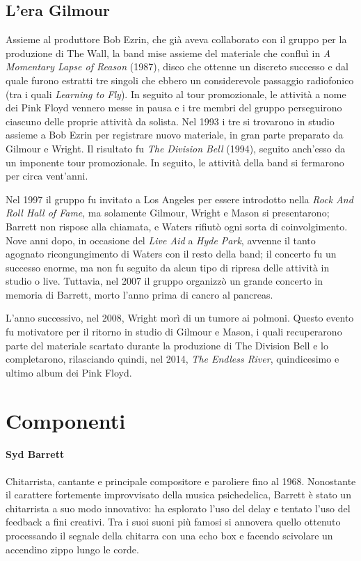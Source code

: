 \documentclass[class=book, crop=false, oneside, 12pt]{standalone}
\begin{document}
    \subsection{L'era Gilmour}
    Assieme al produttore Bob Ezrin, che già aveva collaborato con il gruppo per la produzione di The Wall, la band mise assieme del materiale che confluì in \emph{A Momentary Lapse of Reason} (1987), disco che ottenne un discreto successo e dal quale furono estratti tre singoli che ebbero un considerevole passaggio radiofonico (tra i quali \emph{Learning to Fly}). In seguito al tour promozionale, le attività a nome dei Pink Floyd vennero messe in pausa  e i tre membri del gruppo perseguirono ciascuno delle proprie attività da solista. Nel 1993 i tre si trovarono in studio assieme a Bob Ezrin per registrare nuovo materiale, in gran parte preparato da Gilmour e Wright. Il risultato fu \emph{The Division Bell} (1994), seguito anch'esso da un imponente tour promozionale. In seguito, le attività della band si fermarono per circa vent'anni.

    Nel 1997 il gruppo fu invitato a Los Angeles per essere introdotto nella \emph{Rock And Roll Hall of Fame}, ma solamente Gilmour, Wright e Mason si presentarono; Barrett non rispose alla chiamata, e Waters rifiutò ogni sorta di coinvolgimento. Nove anni dopo, in occasione del \emph{Live Aid} a \emph{Hyde Park}, avvenne il tanto agognato ricongungimento di Waters con il resto della band; il concerto fu un successo enorme, ma non fu seguito da alcun tipo di ripresa delle attività in studio o live. Tuttavia, nel 2007 il gruppo organizzò un grande concerto in memoria di Barrett, morto l'anno prima di cancro al pancreas.

    L'anno successivo, nel 2008, Wright morì di un tumore ai polmoni. Questo evento fu motivatore per il ritorno in studio di Gilmour e Mason, i quali recuperarono parte del materiale scartato durante la produzione di The Division Bell e lo completarono, rilasciando quindi, nel 2014, \emph{The Endless River}, quindicesimo e ultimo album dei Pink Floyd.

    \section{Componenti}
    \paragraph{Syd Barrett}
    Chitarrista, cantante e principale compositore e paroliere fino al 1968. Nonostante il carattere fortemente improvvisato della musica psichedelica, Barrett è stato un chitarrista a suo modo innovativo: ha esplorato l'uso del delay e tentato l'uso del feedback a fini creativi. Tra i suoi suoni più famosi si annovera quello ottenuto processando il segnale della chitarra con una echo box e facendo scivolare un accendino zippo lungo le corde. 
\end{document}
